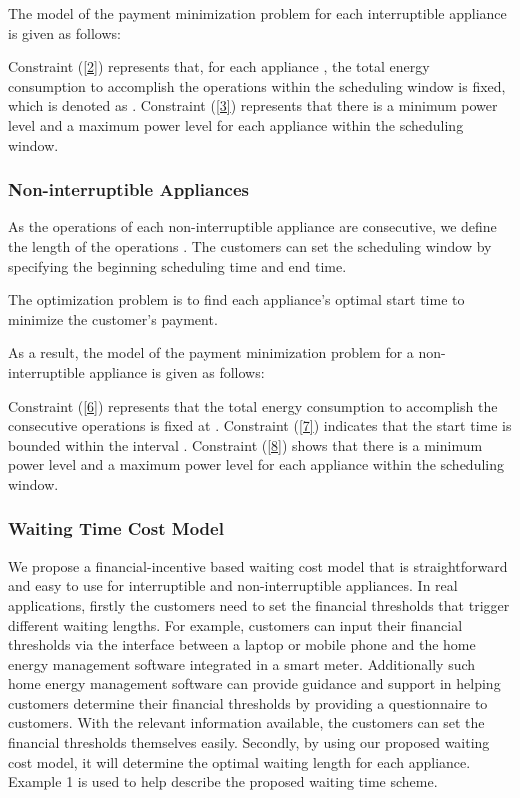 \documentclass[10pt,journal]{IEEEtran}
\theoremstyle{definition}
\theoremstyle{plain} \newtheorem{theo}{Theorem} \newtheorem{prop}{Proposition}  \newtheorem{lemm}{Lemma}
\begin{document}
The model of the payment minimization problem for each interruptible appliance is given as follows:

  
Constraint (\ref{2}) represents that, for each appliance , the total energy consumption to accomplish the operations within the scheduling window  is fixed, which is denoted as . Constraint (\ref{3}) represents that there is a  minimum power level and a maximum power level for each appliance  within the scheduling window. 








\subsubsection{Non-interruptible Appliances} 
As the operations of each non-interruptible appliance  are consecutive, we define the length of the operations . The customers can set the scheduling 
window  by specifying the beginning scheduling time and end time.

The optimization problem is to find each appliance's optimal start time   to minimize the customer's payment. 

As a result, the model of the payment minimization problem for a non-interruptible appliance is given as follows:

  
Constraint (\ref{6}) represents that the total energy consumption to accomplish the consecutive operations is fixed at . Constraint (\ref{7}) indicates that the start time is bounded within the interval . Constraint (\ref{8}) shows that there is a minimum power level and a maximum power level for each appliance  within the scheduling window. 




  

 
\subsubsection{Waiting Time Cost Model}




We propose a financial-incentive based waiting cost model that is straightforward and easy to use for interruptible and non-interruptible appliances. In real applications, firstly the customers need to set the financial thresholds that trigger different waiting lengths. For example, customers can input their financial thresholds via the interface between a laptop or mobile phone and the home energy management software integrated in a smart meter. Additionally such home energy management software can provide guidance and support in helping customers determine their financial thresholds by providing a questionnaire to customers. With the relevant information available, the customers can set the financial thresholds themselves easily. Secondly, by using our proposed waiting cost model, it will determine the optimal waiting length for each appliance. Example 1 is used to help describe the proposed waiting time scheme.
\end{document}
